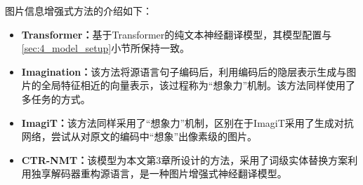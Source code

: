 图片信息增强式方法的介绍如下：
\begin{itemize}
\item \textbf{Transformer：}基于Transformer的纯文本神经翻译模型，其模型配置与\ref{sec:4_model_setup}小节所保持一致。
\item \textbf{Imagination\cite{37_elliott-kadar-2017-imagination}：}该方法将源语言句子编码后，利用编码后的隐层表示生成与图片的全局特征相近的向量表示，该过程称为“想象力”机制。该方法同样使用了多任务的方式。
\item \textbf{ImagiT\cite{51_long-etal-2021-generative}：}该方法同样采用了“想象力”机制，区别在于ImagiT采用了生成对抗网络，尝试从对原文的编码中“想象”出像素级的图片。
\item \textbf{CTR-NMT：}该模型为本文第3章所设计的方法，采用了词级实体替换方案利用独享解码器重构源语言，是一种图片增强式神经翻译模型。
\end{itemize}